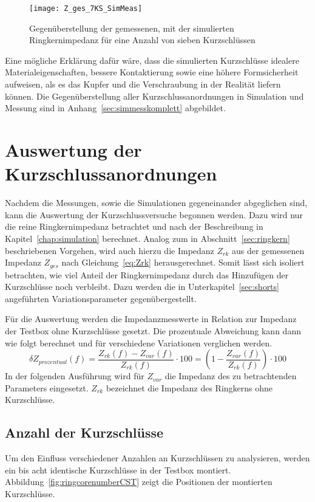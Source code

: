 \begin{figure}[htb]
	\centering
	\texttt{[image: Z\_ges\_7KS\_SimMeas]}
	\caption{Gegen\"uberstellung der gemessenen, mit der simulierten Ringkernimpedanz f\"ur eine Anzahl von sieben Kurzschl\"ussen}
	\label{fig:boxpolycrossrk7ks}
\end{figure}

Eine m\"ogliche Erkl\"arung daf\"ur w\"are, dass die simulierten Kurzschl\"usse idealere Materialeigenschaften, bessere Kontaktierung sowie eine h\"ohere Formsicherheit aufweisen, als es das Kupfer und die Verschraubung in der Realit\"at liefern k\"onnen. Die Gegen\"uberstellung aller Kurzschlussanordnungen in Simulation und Messung sind in Anhang~\ref{sec:simmesskomplett} abgebildet.


\section{Auswertung der Kurzschlussanordnungen}
Nachdem die Messungen, sowie die Simulationen gegeneinander abgeglichen sind, kann die Auswertung der Kurzschlussversuche begonnen werden. Dazu wird nur die reine Ringkernimpedanz betrachtet und nach der Beschreibung in Kapitel~\ref{chap:simulation} berechnet. Analog zum in Abschnitt~\ref{sec:ringkern} beschriebenen Vorgehen, wird auch hierzu die Impedanz $Z_{rk}$ aus der gemessenen Impedanz $Z_{ges}$ nach Gleichung~\ref{eq:Zrk} herausgerechnet. Somit l\"asst sich isoliert betrachten, wie viel Anteil der Ringkernimpedanz durch das Hinzuf\"ugen der Kurzschl\"usse noch verbleibt. Dazu  werden die in Unterkapitel~\ref{sec:shorts} angef\"uhrten Variationsparameter gegenübergestellt.
\par
Für die Auswertung werden die Impedanzmesswerte in Relation zur Impedanz der Testbox ohne Kurzschlüsse gesetzt. Die prozentuale Abweichung kann dann wie folgt berechnet und für verschiedene Variationen verglichen werden.
\begin{equation}
	\delta Z_{prozentual}(f) = \frac{Z_{rk}(f) - Z_{var}(f)}{Z_{rk}(f)}\cdot 100 = \left(1-\frac{Z_{var}(f)}{Z_{rk}(f)}\right)\cdot 100
	\label{eq:maxdiffpercent}
\end{equation}
In der folgenden Ausführung wird für $Z_{var}$ die Impedanz des zu betrachtenden Parameters eingesetzt. $Z_{rk}$ bezeichnet die Impedanz des Ringkerns ohne Kurzschl\"usse.

\subsection{Anzahl der Kurzschl\"usse}
Um den Einfluss verschiedener Anzahlen an Kurzschl\"ussen zu analysieren, werden ein bis acht identische Kurzschl\"usse in der Testbox montiert. Abbildung~\ref{fig:ringcorenumberCST} zeigt die Positionen der montierten Kurzschl\"usse.

